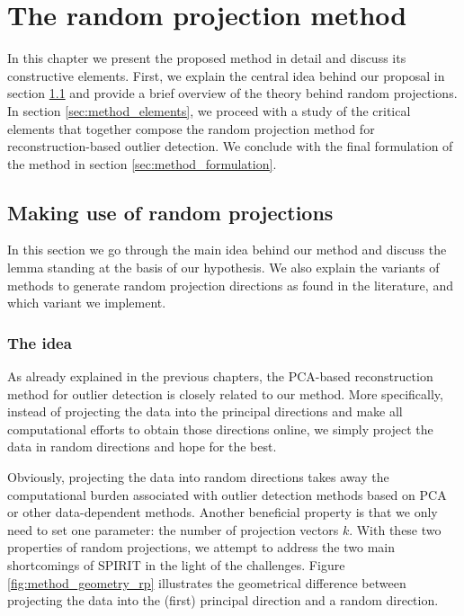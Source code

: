 \chapter{The random projection method}
\label{chap:rp-method}

In this chapter we present the proposed method in detail and discuss its constructive elements. First, we explain the central idea behind our proposal in section \ref{sec:method_idea} and provide a brief overview of the theory behind random projections. In section \ref{sec:method_elements}, we proceed with a study of the critical elements that together compose the random projection method for reconstruction-based outlier detection. We conclude with the final formulation of the method in section \ref{sec:method_formulation}.

\section{Making use of random projections}
\label{sec:method_idea}
In this section we go through the main idea behind our method and discuss the lemma standing at the basis of our hypothesis. We also explain the variants of methods to generate random projection directions as found in the literature, and which variant we implement.

\subsection{The idea}
As already explained in the previous chapters, the PCA-based reconstruction method for outlier detection is closely related to our method. More specifically, instead of projecting the data into the principal directions and make all computational efforts to obtain those directions online, we simply project the data in random directions and hope for the best. 

Obviously, projecting the data into random directions takes away the computational burden associated with outlier detection methods based on PCA or other data-dependent methods. Another beneficial property is that we only need to set one parameter: the number of projection vectors $k$. With these two properties of random projections, we attempt to address the two main shortcomings of SPIRIT in the light of the challenges. Figure \ref{fig:method_geometry_rp} illustrates the geometrical difference between projecting the data into the (first) principal direction and a random direction. 

